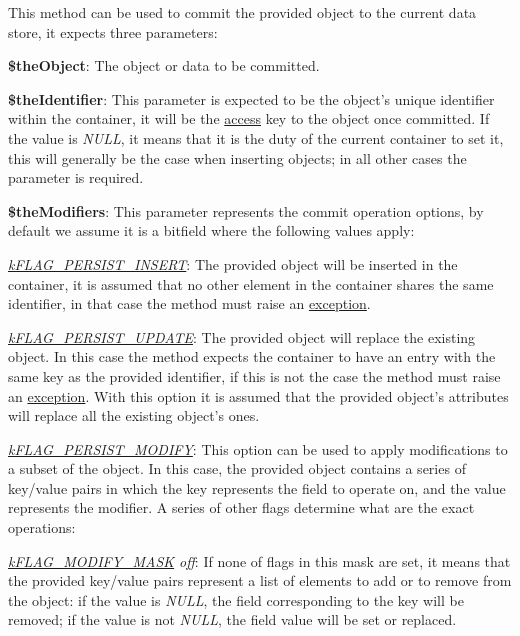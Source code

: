 This method can be used to commit the provided object to the current data store, it expects three parameters\-:


\begin{DoxyItemize}
\item {\bfseries \$the\-Object}\-: The object or data to be committed. 
\item {\bfseries \$the\-Identifier}\-: This parameter is expected to be the object's unique identifier within the container, it will be the \hyperlink{class_c_container_a48db96aa6bbf15d0bfc15725616b7154}{access} key to the object once committed. If the value is {\itshape N\-U\-L\-L}, it means that it is the duty of the current container to set it, this will generally be the case when inserting objects; in all other cases the parameter is required. 
\item {\bfseries \$the\-Modifiers}\-: This parameter represents the commit operation options, by default we assume it is a bitfield where the following values apply\-: 
\begin{DoxyItemize}
\item {\itshape \hyperlink{}{k\-F\-L\-A\-G\-\_\-\-P\-E\-R\-S\-I\-S\-T\-\_\-\-I\-N\-S\-E\-R\-T}}\-: The provided object will be inserted in the container, it is assumed that no other element in the container shares the same identifier, in that case the method must raise an \hyperlink{}{exception}. 
\item {\itshape \hyperlink{}{k\-F\-L\-A\-G\-\_\-\-P\-E\-R\-S\-I\-S\-T\-\_\-\-U\-P\-D\-A\-T\-E}}\-: The provided object will replace the existing object. In this case the method expects the container to have an entry with the same key as the provided identifier, if this is not the case the method must raise an \hyperlink{}{exception}. With this option it is assumed that the provided object's attributes will replace all the existing object's ones. 
\item {\itshape \hyperlink{}{k\-F\-L\-A\-G\-\_\-\-P\-E\-R\-S\-I\-S\-T\-\_\-\-M\-O\-D\-I\-F\-Y}}\-: This option can be used to apply modifications to a subset of the object. In this case, the provided object contains a series of key/value pairs in which the key represents the field to operate on, and the value represents the modifier. A series of other flags determine what are the exact operations\-: 
\begin{DoxyItemize}
\item {\itshape \hyperlink{}{k\-F\-L\-A\-G\-\_\-\-M\-O\-D\-I\-F\-Y\-\_\-\-M\-A\-S\-K} off}\-: If none of flags in this mask are set, it means that the provided key/value pairs represent a list of elements to add or to remove from the object\-: if the value is {\itshape N\-U\-L\-L}, the field corresponding to the key will be removed; if the value is not {\itshape N\-U\-L\-L}, the field value will be set or replaced. 

\end{DoxyItemize}
\end{DoxyItemize}
\end{DoxyItemize}
